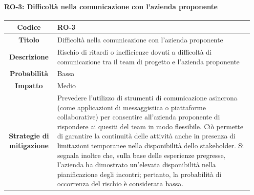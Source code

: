 \documentclass[a4paper,12pt]{article}
\begin{document}
{{            \paragraph{RO-3: Difficoltà nella comunicazione con l'azienda proponente}\mbox{}{ 
                \begin{longtable}{|c|p{11cm}|}
                    \hline
                    \textbf{Codice} & RO-3 \\
                    \hline
                    \textbf{Titolo} & Difficoltà nella comunicazione con l'azienda proponente \\
                    \hline
                    \textbf{Descrizione} & Rischio di ritardi o inefficienze dovuti a difficoltà di comunicazione tra il team di progetto e l'azienda proponente \\
                    \hline
                    \textbf{Probabilità} & Bassa \\
                    \hline
                    \textbf{Impatto} & Medio \\
                    \hline
                    \textbf{Strategie di mitigazione} & Prevedere l'utilizzo di strumenti di comunicazione asincrona (come applicazioni di messaggistica o piattaforme collaborative) per consentire all'azienda proponente di rispondere ai quesiti del team in modo flessibile. Ciò permette di garantire la continuità delle attività anche in presenza di limitazioni temporanee nella disponibilità dello stakeholder.
                    Si segnala inoltre che, sulla base delle esperienze pregresse, l'azienda ha dimostrato un'elevata disponibilità nella pianificazione degli incontri; pertanto, la probabilità di occorrenza del rischio è considerata bassa. \\
                    \hline
                \end{longtable}
            }

}}
\end{document}
